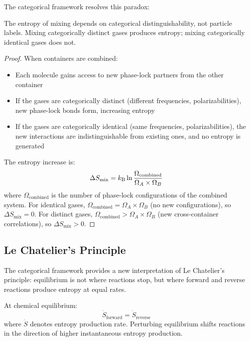 The categorical framework resolves this paradox:

\begin{theorem}
\label{thm:gibbs}
The entropy of mixing depends on categorical distinguishability, not particle labels. Mixing categorically distinct gases produces entropy; mixing categorically identical gases does not.
\end{theorem}

\begin{proof}
When containers are combined:
\begin{itemize}
\item Each molecule gains access to new phase-lock partners from the other container
\item If the gases are categorically distinct (different frequencies, polarizabilities), new phase-lock bonds form, increasing entropy
\item If the gases are categorically identical (same frequencies, polarizabilities), the new interactions are indistinguishable from existing ones, and no entropy is generated
\end{itemize}

The entropy increase is:
\begin{equation}
\Delta S_{\text{mix}} = k_{\mathrm{B}} \ln \frac{\Omega_{\text{combined}}}{\Omega_A \times \Omega_B}
\end{equation}
where $\Omega_{\text{combined}}$ is the number of phase-lock configurations of the combined system. For identical gases, $\Omega_{\text{combined}} = \Omega_A \times \Omega_B$ (no new configurations), so $\Delta S_{\text{mix}} = 0$. For distinct gases, $\Omega_{\text{combined}} > \Omega_A \times \Omega_B$ (new cross-container correlations), so $\Delta S_{\text{mix}} > 0$.
\end{proof}

\subsection{Le Chatelier's Principle}

The categorical framework provides a new interpretation of Le Chatelier's principle: equilibrium is not where reactions stop, but where forward and reverse reactions produce entropy at equal rates.

\begin{theorem}
\label{thm:lechatelier}
At chemical equilibrium:
\begin{equation}
\dot{S}_{\text{forward}} = \dot{S}_{\text{reverse}}
\end{equation}
where $\dot{S}$ denotes entropy production rate. Perturbing equilibrium shifts reactions in the direction of higher instantaneous entropy production.
\end{theorem}

